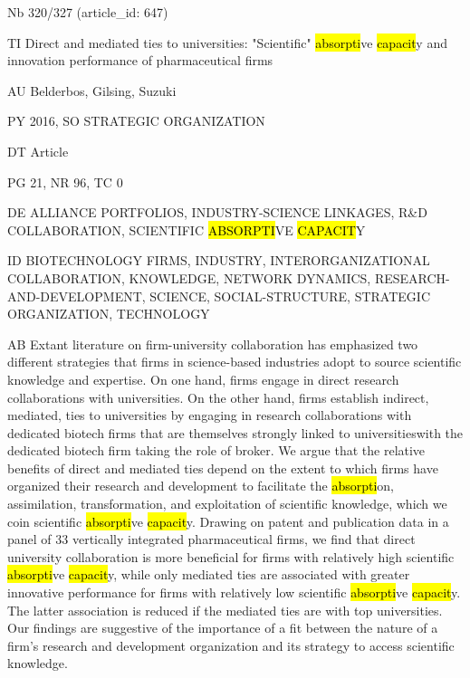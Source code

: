 \documentclass[a4paper]{article}
\begin{document}
\vspace*{-2cm}
Nb \tabto{0cm}320/327 (article\_id: 647)\par
TI \tabto{0cm}Direct and mediated ties to universities: "Scientific" \hl{absorpti}ve \hl{capacit}y and innovation performance of pharmaceutical firms\par
AU \tabto{0cm}Belderbos, Gilsing, Suzuki\par
PY \tabto{0cm}2016, SO STRATEGIC ORGANIZATION\par
DT \tabto{0cm}Article\par
PG \tabto{0cm}21, NR 96, TC 0\par
DE \tabto{0cm}ALLIANCE PORTFOLIOS, INDUSTRY-SCIENCE LINKAGES, R\&D COLLABORATION, SCIENTIFIC \hl{ABSORPTI}VE \hl{CAPACIT}Y\par
ID \tabto{0cm}BIOTECHNOLOGY FIRMS, INDUSTRY, INTERORGANIZATIONAL COLLABORATION, KNOWLEDGE, NETWORK DYNAMICS, RESEARCH-AND-DEVELOPMENT, SCIENCE, SOCIAL-STRUCTURE, STRATEGIC ORGANIZATION, TECHNOLOGY\par
AB \tabto{0cm}Extant literature on firm-university collaboration has emphasized two different strategies that firms in science-based industries adopt to source scientific knowledge and expertise. On one hand, firms engage in direct research collaborations with universities. On the other hand, firms establish indirect, mediated, ties to universities by engaging in research collaborations with dedicated biotech firms that are themselves strongly linked to universitieswith the dedicated biotech firm taking the role of broker. We argue that the relative benefits of direct and mediated ties depend on the extent to which firms have organized their research and development to facilitate the \hl{absorpti}on, assimilation, transformation, and exploitation of scientific knowledge, which we coin scientific \hl{absorpti}ve \hl{capacit}y. Drawing on patent and publication data in a panel of 33 vertically integrated pharmaceutical firms, we find that direct university collaboration is more beneficial for firms with relatively high scientific \hl{absorpti}ve \hl{capacit}y, while only mediated ties are associated with greater innovative performance for firms with relatively low scientific \hl{absorpti}ve \hl{capacit}y. The latter association is reduced if the mediated ties are with top universities. Our findings are suggestive of the importance of a fit between the nature of a firm's research and development organization and its strategy to access scientific knowledge.\par
\clearpage
\end{document}
